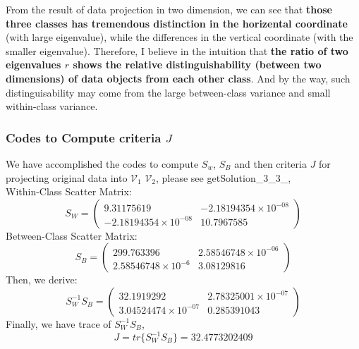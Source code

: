 \documentclass[11pt,a4paper]{article}
\newcommand{\htab}{\hspace*{0.63cm}}
\newcommand{\V}{\mathcal{V}}
\begin{document}
    \htab From the result of data projection in two dimension, we can see that \textbf{those three classes has tremendous distinction in the horizental coordinate} (with large eigenvalue), while the differences in the vertical coordinate (with the smaller eigenvalue). Therefore, I believe in the intuition that \textbf{the ratio of two eigenvalues $r$ shows the relative distinguishability (between two dimensions) of data objects from each other class}. And by the way, such distinguisability may come from the large between-class variance and small within-class variance.
\newpage

\subsubsection{Codes to Compute criteria $J$}
\htab We have accomplished the codes to compute $S_{w}$, $S_{B}$ and then criteria $J$ for projecting original data into $\V_{1}$ $\V_{2}$, please see getSolution\_3\_3\_, \\
\htab Within-Class Scatter Matrix:\\
$$ S_{W} = \begin{pmatrix}   
    9.31175619 &  -2.18194354\times 10^{-08} \\
    -2.18194354\times 10^{-08}   &  10.7967585  
 \end{pmatrix} $$
\htab Between-Class Scatter Matrix:\\
$$ S_{B} = \begin{pmatrix}
    299.763396  & 2.58546748\times 10^{-06}  \\
    2.58546748\times 10^{-6}  &  3.08129816  
\end{pmatrix} $$
\htab Then, we derive: \\
$$ S_{W}^{-1} S_{B} = \begin{pmatrix}
    32.1919292  &  2.78325001\times 10^{-07} \\
    3.04524474\times 10^{-07}   & 0.285391043
    \end{pmatrix} $$
\htab Finally, we have trace of $ S_{W}^{-1} S_{B} $,
$$ J = tr\{S_{W}^{-1}S_{B}\} = 32.4773202409 $$

\end{document}
